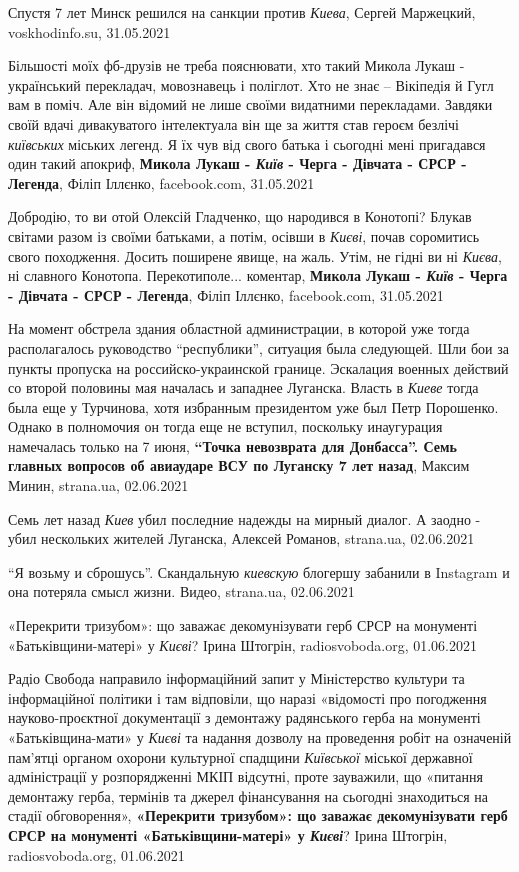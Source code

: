 Спустя 7 лет Минск решился на санкции против \emph{Киева},
Сергей Маржецкий, voskhodinfo.su, 31.05.2021

Більшості моїх фб-друзів не треба пояснювати, хто такий Микола Лукаш -
український перекладач, мовознавець і поліглот. Хто не знає – Вікіпедія й Гугл
вам в поміч. Але він відомий не лише своїми видатними перекладами. Завдяки
своїй вдачі дивакуватого інтелектуала він ще за життя став героєм безлічі
\emph{київських} міських легенд. Я їх чув від свого батька і сьогодні мені пригадався
один такий апокриф,
\textbf{Микола Лукаш - \emph{Київ} - Черга - Дівчата - СРСР - Легенда}, Філіп Іллєнко, facebook.com, 31.05.2021

Добродію, то ви отой Олексій Гладченко, що народився в Конотопі? Блукав світами
разом із своїми батьками, а потім, осівши в \emph{Києві}, почав соромитись
свого походження. Досить поширене явище, на жаль.  Утім, не гідні ви ні
\emph{Києва}, ні славного Конотопа. Перекотиполе...
коментар, \textbf{Микола Лукаш - \emph{Київ} - Черга - Дівчата - СРСР - Легенда}, Філіп Іллєнко, facebook.com, 31.05.2021

На момент обстрела здания областной администрации, в которой уже тогда
располагалось руководство \enquote{республики}, ситуация была следующей. Шли бои за
пункты пропуска на российско-украинской границе. Эскалация военных действий со
второй половины мая началась и западнее Луганска. Власть в \emph{Киеве} тогда была
еще у Турчинова, хотя избранным президентом уже был Петр Порошенко. Однако в
полномочия он тогда еще не вступил, поскольку инаугурация намечалась только на
7 июня,
\textbf{\enquote{Точка невозврата для Донбасса}. Семь главных вопросов об авиаударе ВСУ по Луганску 7 лет назад},
Максим Минин, strana.ua, 02.06.2021

Семь лет назад \emph{Киев} убил последние надежды на мирный диалог. А заодно - убил нескольких жителей Луганска,
Алексей Романов, strana.ua, 02.06.2021

\enquote{Я возьму и сброшусь}. Скандальную \emph{киевскую} блогершу забанили в Instagram и она потеряла смысл жизни. Видео,
strana.ua, 02.06.2021

«Перекрити тризубом»: що заважає декомунізувати герб СРСР на монументі «Батьківщини-матері» у \emph{Києві}?
Ірина Штогрін, radiosvoboda.org, 01.06.2021

Радіо Свобода направило інформаційний запит у Міністерство культури та
інформаційної політики і там відповіли, що наразі «відомості про погодження
науково-проєктної документації з демонтажу радянського герба на монументі
«Батьківщина-мати» у \emph{Києві} та надання дозволу на проведення робіт на
означеній пам'ятці органом охорони культурної спадщини \emph{Київської} міської
державної адміністрації у розпорядженні МКІП відсутні, проте зауважили, що
«питання демонтажу герба, термінів та джерел фінансування на сьогодні
знаходиться на стадії обговорення»,
\textbf{«Перекрити тризубом»: що заважає декомунізувати герб СРСР на монументі «Батьківщини-матері» у \emph{Києві}}?
Ірина Штогрін, radiosvoboda.org, 01.06.2021

